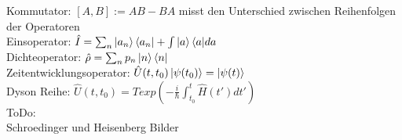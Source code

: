 \documentclass{article}
\begin{document}
Kommutator: $[A, B] := AB - BA$ misst den Unterschied zwischen Reihenfolgen der Operatoren \\

Einsoperator: $\hat{I}=\sum_n{\ket{a_n}\bra{a_n}} + \int{\ket{a}\bra{a}}da$ \\

Dichteoperator: $\hat{\rho}=\sum_n{p_n \ket{n}\bra{n}}$ \\

Zeitentwicklungsoperator: $\hat{U}(t, t_0)\ket{\psi(t_0)} = \ket{\psi(t)}$ \\


Dyson Reihe:  $\hat{U}(t, t_0) = T exp\left(-\frac{i}{\hbar} \int_{t_0}^t{\hat{H}(t')}dt' \right)$ \\

ToDo: \\
Schroedinger und Heisenberg Bilder
\end{document}
